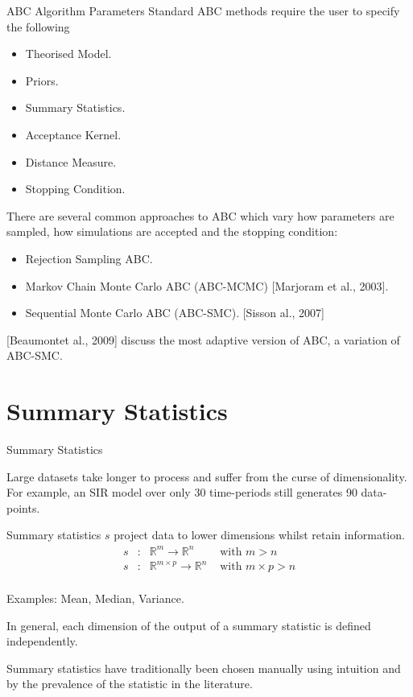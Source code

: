 \documentclass[aspectratio=169]{beamer}
\begin{document}
\begin{frame}{ABC Algorithm Parameters}
  \setlength{\parskip}{.1\baselineskip}
  Standard ABC methods require the user to specify the following
  \begin{multicols}{2}
    \begin{itemize}
      \item Theorised Model.
      \item Priors.
      \item Summary Statistics.
      \item Acceptance Kernel.
      \item Distance Measure.
      \item Stopping Condition.
    \end{itemize}
  \end{multicols}
  \par There are several common approaches to ABC which vary how parameters are sampled, how simulations are accepted and the stopping condition:
  \begin{itemize}
    \item Rejection Sampling ABC.
    \item Markov Chain Monte Carlo ABC (ABC-MCMC) [Marjoram et al., 2003].
    \item Sequential Monte Carlo ABC (ABC-SMC). [Sisson al., 2007]
  \end{itemize}
  [Beaumontet al., 2009] discuss the most adaptive version of ABC, a variation of ABC-SMC.
\end{frame}

\section{Summary Statistics}

\begin{frame}{Summary Statistics}
  \par Large datasets take longer to process and suffer from the curse of dimensionality. For example, an SIR model over only 30 time-periods still generates 90 data-points.
  \par Summary statistics $s$ project data to lower dimensions whilst retain information.
  \[\begin{array}{rcll}
    s&:&\mathbb{R}^m\to\mathbb{R}^n&\text{ with }m>n\\
    s&:&\mathbb{R}^{m\times p}\to\mathbb{R}^n&\text{ with }m\times p>n\\
  \end{array}\]
  \par Examples: Mean, Median, Variance.
  \par In general, each dimension of the output of a summary statistic is defined independently.
  \par Summary statistics have traditionally been chosen manually using intuition and by the prevalence of the statistic in the literature.
\end{frame}
\end{document}
